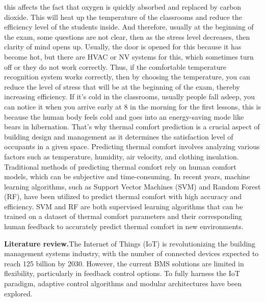 \begin{multicols}{2}
this affects the fact that oxygen is quickly absorbed and replaced by
carbon dioxide. This will heat up the temperature of the classrooms and
reduce the efficiency level of the students inside. And therefore,
usually at the beginning of the exam, some questions are not clear, then
as the stress level decreases, then clarity of mind opens up. Usually,
the door is opened for this because it has become hot, but there are
HVAC or NV systems for this, which sometimes turn off or they do not
work correctly. Thus, if the comfortable temperature recognition system
works correctly, then by choosing the temperature, you can reduce the
level of stress that will be at the beginning of the exam, thereby
increasing efficiency. If it's cold in the classrooms, usually people
fall asleep, you can notice it when you arrive early at 8 in the morning
for the first lessons, this is because the human body feels cold and
goes into an energy-saving mode like bears in hibernation. That's why
thermal comfort prediction is a crucial aspect of building design and
management as it determines the satisfaction level of occupants in a
given space. Predicting thermal comfort involves analyzing various
factors such as temperature, humidity, air velocity, and clothing
insulation. Traditional methods of predicting thermal comfort rely on
human comfort models, which can be subjective and time-consuming. In
recent years, machine learning algorithms, such as Support Vector
Machines (SVM) and Random Forest (RF), have been utilized to predict
thermal comfort with high accuracy and efficiency. SVM and RF are both
supervised learning algorithms that can be trained on a dataset of
thermal comfort parameters and their corresponding human feedback to
accurately predict thermal comfort in new environments.

{\bfseries Literature review.}The Internet of Things (IoT) is
revolutionizing the building management systems industry, with the
number of connected devices expected to reach 125 billion by 2030.
However, the current BMS solutions are limited in flexibility,
particularly in feedback control options. To fully harness the IoT
paradigm, adaptive control algorithms and modular architectures have
been explored.


\end{multicols}
